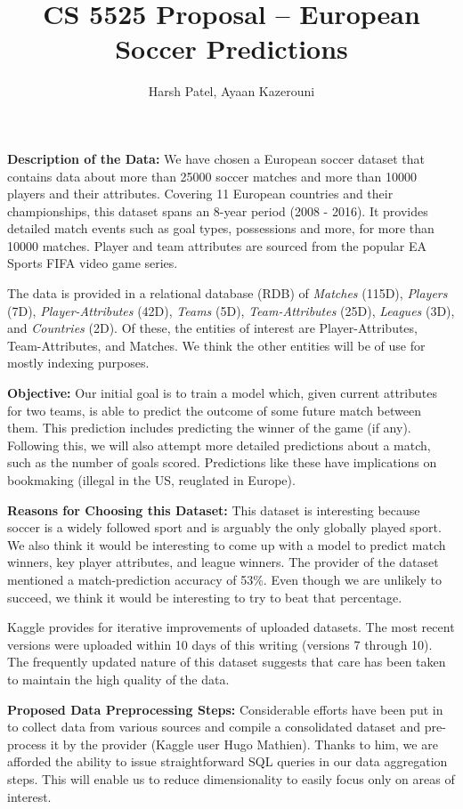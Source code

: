 \documentclass[11pt, letterpaper]{article}
\begin{document}
\title{CS 5525 Proposal -- European Soccer Predictions}
\author{Harsh Patel, Ayaan Kazerouni}
\date{}
\maketitle
\textbf{Description of the Data:} We have chosen a European soccer dataset that contains data about more than 25000 soccer matches and more than 10000 players and their attributes.
Covering 11 European countries and their championships, this dataset spans an 8-year period (2008 - 2016).
It provides detailed match events such as goal types, possessions and more, for more than 10000 matches.
Player and team attributes are sourced from the popular EA Sports FIFA video game series.

The data is provided in a relational database (RDB) of \textit{Matches} (115D), \textit{Players} (7D), \textit{Player-Attributes} (42D), \textit{Teams} (5D), \textit{Team-Attributes} (25D), \textit{Leagues} (3D), and \textit{Countries} (2D).
Of these, the entities of interest are Player-Attributes, Team-Attributes, and Matches.
We think the other entities will be of use for mostly indexing purposes.

\textbf{Objective:} Our initial goal is to train a model which, given current attributes for two teams, is able to predict the outcome of some future match between them.
This prediction includes predicting the winner of the game (if any).
Following this, we will also attempt more detailed predictions about a match, such as the number of goals scored.
Predictions like these have implications on bookmaking (illegal in the US, reuglated in Europe).

\textbf{Reasons for Choosing this Dataset:} This dataset is interesting because soccer is a widely followed sport and is arguably the only globally played sport.
We also think it would be interesting to come up with a model to predict match winners, key player attributes, and league winners.
The provider of the dataset mentioned a match-prediction accuracy of 53\%.
Even though we are unlikely to succeed, we think it would be interesting to try to beat that percentage.

Kaggle provides for iterative improvements of uploaded datasets.
The most recent versions were uploaded within 10 days of this writing (versions 7 through 10).
The frequently updated nature of this dataset suggests that care has been taken to maintain the high quality of the data.

\textbf{Proposed Data Preprocessing Steps:} Considerable efforts have been put in to collect data from various sources and compile a consolidated dataset and pre-process it by the provider (Kaggle user Hugo Mathien).
Thanks to him, we are afforded the ability to issue straightforward SQL queries in our data aggregation steps.
This will enable us to reduce dimensionality to easily focus only on areas of interest.
\end{document}
